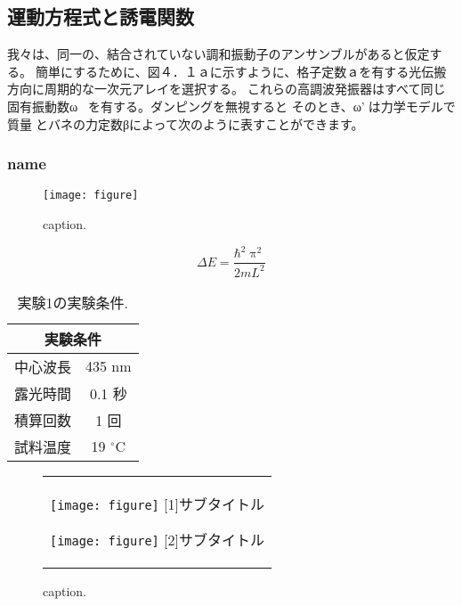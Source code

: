 \documentclass[11pt]{jsarticle}%
\begin{document}
\subsection{運動方程式と誘電関数}%

我々は、同一の、結合されていない調和振動子のアンサンブルがあると仮定する。簡単にするために、図４．１ａに示すように、格子定数ａを有する光伝搬方向に周期的な一次元アレイを選択する。これらの高調波発振器はすべて同じ固有振動数ω０を有する。ダンピングを無視すると
そのとき、ω’は力学モデルで質量とバネの力定数βによって次のように表すことができます。

\subsubsection{name}%

\begin{figure}[h]%
 \centering%
 \texttt{[image: figure]}%
 \caption{caption.}%
 \label{label}%
\end{figure}%
\fi

\begin{equation}%
 \Delta E=\frac{\mathrm{\hbar}^{2}\uppi^{2}}{2mL^{2}}%
 \label{eq_qw}%
\end{equation}%
\fi

\begin{table}[ht]%
 \centering
 \caption{実験1の実験条件.}
 \begin{tabular}{lc}\hline
  \multicolumn{2}{c}{実験条件} \\ \hline
  中心波長 & 435 nm            \\
  露光時間 & 0.1 秒            \\
  積算回数 & 1 回              \\
  試料温度 & 19 ${}^\circ$C    \\ \hline
 \end{tabular}
 \label{col_1}%
\end{table}%
\fi

\begin{figure}[ht]%
 \centering%
 \begin{tabular}{c}%
  \begin{minipage}{0.5\hsize}%
   \centering
   \texttt{[image: figure]}
   \hspace{1.6cm} [1]サブタイトル%
  \end{minipage}

  \begin{minipage}{0.33\hsize}
   \centering
   \texttt{[image: figure]}
   \hspace{1.6cm} [2]サブタイトル%
  \end{minipage}
 \end{tabular}%
 \caption{caption.}%
 \label{label}%

\end{figure}
\fi
\end{document}
